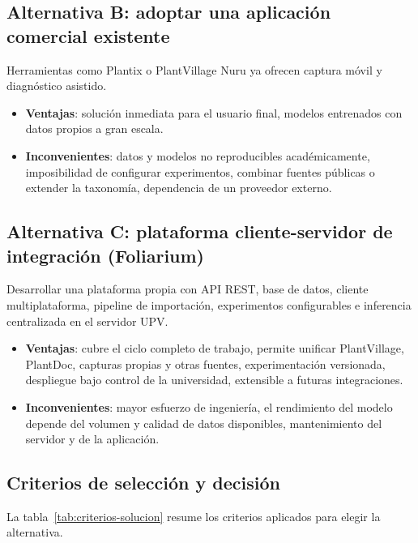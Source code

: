 \documentclass[11pt,spanish,listoffigures,listoftables]{tfgetsinf}
\begin{document}
\subsection{Alternativa B: adoptar una aplicación comercial existente}

Herramientas como Plantix o PlantVillage Nuru ya ofrecen captura móvil y diagnóstico asistido.

\begin{itemize}
    \item \textbf{Ventajas}: solución inmediata para el usuario final, modelos entrenados con datos propios a gran escala.
    \item \textbf{Inconvenientes}: datos y modelos no reproducibles académicamente, imposibilidad de configurar experimentos, combinar fuentes públicas o extender la taxonomía, dependencia de un proveedor externo.
\end{itemize}

\subsection{Alternativa C: plataforma cliente-servidor de integración (Foliarium)}

Desarrollar una plataforma propia con API REST, base de datos, cliente multiplataforma, pipeline de importación, experimentos configurables e inferencia centralizada en el servidor UPV.

\begin{itemize}
    \item \textbf{Ventajas}: cubre el ciclo completo de trabajo, permite unificar PlantVillage, PlantDoc, capturas propias y otras fuentes, experimentación versionada, despliegue bajo control de la universidad, extensible a futuras integraciones.
    \item \textbf{Inconvenientes}: mayor esfuerzo de ingeniería, el rendimiento del modelo depende del volumen y calidad de datos disponibles, mantenimiento del servidor y de la aplicación.
\end{itemize}

\subsection{Criterios de selección y decisión}

La tabla~\ref{tab:criterios-solucion} resume los criterios aplicados para elegir la alternativa.
\end{document}
